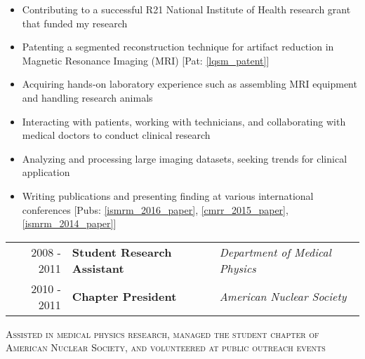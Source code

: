 \begin{minipage}{\textwidth}
	\begin{center}
		\begin{itemize}
			\item Contributing to a successful R21 National Institute of Health research grant that funded my research
			\item Patenting a segmented reconstruction technique for artifact reduction in Magnetic Resonance Imaging (MRI) [Pat: \ref{lqsm_patent}]
			\item Acquiring hands-on laboratory experience such as assembling MRI equipment and handling research animals
			\item Interacting with patients, working with technicians, and collaborating with medical doctors to conduct clinical research
			\item Analyzing and processing large imaging datasets, seeking trends for clinical application %
			\item Writing publications and presenting finding at various international conferences [Pubs: \ref{ismrm_2016_paper}, \ref{cmrr_2015_paper}, \ref{ismrm_2014_paper}]
	\end{itemize}
	\end{center}
\end{minipage}


\begin{minipage}{\textwidth}
		\begin{tabular}{r|ll}
			2008 - 2011 & \textbf{Student Research Assistant} & \textit{Department of Medical Physics} \\
			2010 - 2011 & \textbf{Chapter President} & \textit{American Nuclear Society} \\
		\end{tabular}
\end{minipage}

\begin{center}
	\begin{minipage}{0.9\textwidth}
		\begin{center}
			\textsc{\Large Assisted in medical physics research, managed the student chapter of American Nuclear Society, and volunteered at public outreach events} \vspace{2mm}
		\end{center}
	\end{minipage}
\end{center}

